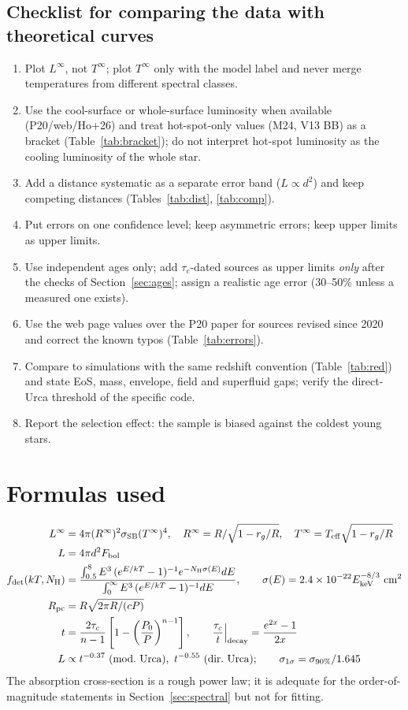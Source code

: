 \documentclass[11pt,a4paper]{article}
\begin{document}
\subsection{Checklist for comparing the data with theoretical curves}
\begin{enumerate}[leftmargin=1.5em,itemsep=0pt]
\item Plot $L^\infty$, not $T^\infty$; plot $T^\infty$ only with the model label and never merge temperatures from different spectral classes.
\item Use the cool-surface or whole-surface luminosity when available (P20/web/Ho+26) and treat hot-spot-only values (M24, V13 BB) as a bracket (Table~\ref{tab:bracket}); do not interpret hot-spot luminosity as the cooling luminosity of the whole star.
\item Add a distance systematic as a separate error band ($L\propto d^2$) and keep competing distances (Tables~\ref{tab:dist}, \ref{tab:comp}).
\item Put errors on one confidence level; keep asymmetric errors; keep upper limits as upper limits.
\item Use independent ages only; add $\tau_c$-dated sources as upper limits \emph{only} after the checks of Section~\ref{sec:ages}; assign a realistic age error (30--50\% unless a measured one exists).
\item Use the web page values over the P20 paper for sources revised since 2020 and correct the known typos (Table~\ref{tab:errors}).
\item Compare to simulations with the same redshift convention (Table~\ref{tab:red}) and state EoS, mass, envelope, field and superfluid gaps; verify the direct-Urca threshold of the specific code.
\item Report the selection effect: the sample is biased against the coldest young stars.
\end{enumerate}

\appendix
\section{Formulas used}\label{app:formulas}
\begin{align}
L^\infty &= 4\pi (R^\infty)^2\sigma_{\rm SB}(T^\infty)^4,\quad R^\infty=R/\sqrt{1-r_g/R},\quad T^\infty=T_{\rm eff}\sqrt{1-r_g/R}\\
L &= 4\pi d^2 F_{\rm bol}\\
f_{\rm det}(kT,N_{\rm H}) &= \frac{\int_{0.5}^{8}E^3\,(e^{E/kT}-1)^{-1}e^{-N_{\rm H}\sigma(E)}dE}{\int_0^\infty E^3\,(e^{E/kT}-1)^{-1}dE},\qquad \sigma(E)=2.4\times10^{-22}E_{\rm keV}^{-8/3}\ {\rm cm^2}\\
R_{\rm pc} &= R\sqrt{2\pi R/(cP)}\\
t &= \frac{2\tau_c}{n-1}\left[1-\left(\frac{P_0}{P}\right)^{n-1}\right],\qquad \frac{\tau_c}{t}\Big|_{\rm decay}=\frac{e^{2x}-1}{2x}\\
L&\propto t^{-0.37}\ ({\rm mod.\ Urca}),\ t^{-0.55}\ ({\rm dir.\ Urca});\qquad \sigma_{1\sigma}=\sigma_{90\%}/1.645
\end{align}
The absorption cross-section is a rough power law; it is adequate for the order-of-magnitude statements in Section~\ref{sec:spectral} but not for fitting.
\end{document}
